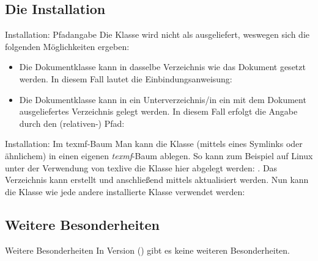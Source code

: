 \documentclass{sopra-seraphim}
\begin{document}
    \subsection{Die Installation}
    \begin{frame}[fragile]{Installation: Pfadangabe}
        Die Klasse wird nicht als  ausgeliefert, weswegen sich die 
    folgenden Möglichkeiten ergeben:
\begin{itemize}
    \item Die Dokumentklasse kann in dasselbe Verzeichnis wie das Dokument
    gesetzt werden. In diesem Fall lautet die Einbindungsanweisung:
    \item Die Dokumentklasse kann in ein Unterverzeichnis/in ein mit
                dem Dokument ausgeliefertes Verzeichnis gelegt werden. In
                diesem Fall erfolgt die Angabe durch den (relativen-) Pfad:
\end{itemize}

    \end{frame}

    \begin{frame}[fragile]{Installation: Im texmf-Baum}
        Man kann die Klasse (mittels eines Symlinks oder ähnlichem)
        in einen eigenen \emph{texmf}-Baum ablegen.
        So kann zum Beispiel auf Linux unter der Verwendung von texlive
        die Klasse hier abgelegt werden: .
        Das Verzeichnis kann erstellt und anschließend mittels
         aktualisiert werden. Nun kann
        die Klasse wie jede andere installierte Klasse verwendet werden:
    \end{frame}

    \subsection{Weitere Besonderheiten}
    \begin{frame}[fragile]{Weitere Besonderheiten}
        In Version \thesosversion{} () gibt es keine weiteren Besonderheiten.
    \end{frame}
\end{document}
